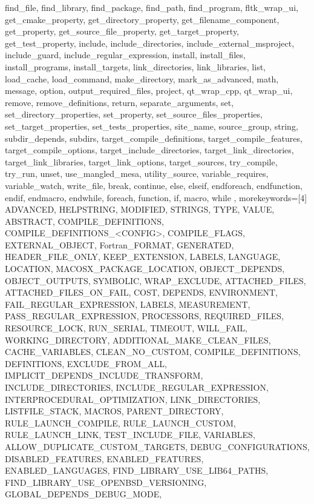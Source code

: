 {{      find_file, find_library, find_package, find_path, find_program,
      fltk_wrap_ui, get_cmake_property, get_directory_property,
      get_filename_component, get_property, get_source_file_property,
      get_target_property, get_test_property, include, include_directories,
      include_external_msproject, include_guard,
      include_regular_expression, install, install_files, install_programs,
      install_targets, link_directories, link_libraries, list, load_cache,
      load_command, make_directory, mark_as_advanced, math, message,
      option, output_required_files, project, qt_wrap_cpp, qt_wrap_ui,
      remove, remove_definitions, return, separate_arguments, set,
      set_directory_properties, set_property, set_source_files_properties,
      set_target_properties, set_tests_properties, site_name, source_group,
      string, subdir_depends, subdirs, target_compile_definitions,
      target_compile_features, target_compile_options,
      target_include_directories, target_link_directories,
      target_link_libraries, target_link_options, target_sources,
      try_compile, try_run, unset, use_mangled_mesa, utility_source,
      variable_requires, variable_watch, write_file, break, continue, else,
      elseif, endforeach, endfunction, endif, endmacro, endwhile, foreach,
      function, if, macro, while },
    morekeywords=[4]{ ADVANCED, HELPSTRING, MODIFIED, STRINGS, TYPE, VALUE,
      ABSTRACT, COMPILE_DEFINITIONS, COMPILE_DEFINITIONS_<CONFIG>,
      COMPILE_FLAGS, EXTERNAL_OBJECT, Fortran_FORMAT, GENERATED,
      HEADER_FILE_ONLY, KEEP_EXTENSION, LABELS, LANGUAGE, LOCATION,
      MACOSX_PACKAGE_LOCATION, OBJECT_DEPENDS, OBJECT_OUTPUTS, SYMBOLIC,
      WRAP_EXCLUDE, ATTACHED_FILES, ATTACHED_FILES_ON_FAIL, COST, DEPENDS,
      ENVIRONMENT, FAIL_REGULAR_EXPRESSION, LABELS, MEASUREMENT,
      PASS_REGULAR_EXPRESSION, PROCESSORS, REQUIRED_FILES, RESOURCE_LOCK,
      RUN_SERIAL, TIMEOUT, WILL_FAIL, WORKING_DIRECTORY,
      ADDITIONAL_MAKE_CLEAN_FILES, CACHE_VARIABLES, CLEAN_NO_CUSTOM,
      COMPILE_DEFINITIONS, DEFINITIONS, EXCLUDE_FROM_ALL,
      IMPLICIT_DEPENDS_INCLUDE_TRANSFORM, INCLUDE_DIRECTORIES,
      INCLUDE_REGULAR_EXPRESSION, INTERPROCEDURAL_OPTIMIZATION,
      LINK_DIRECTORIES, LISTFILE_STACK, MACROS, PARENT_DIRECTORY,
      RULE_LAUNCH_COMPILE, RULE_LAUNCH_CUSTOM, RULE_LAUNCH_LINK,
      TEST_INCLUDE_FILE, VARIABLES, ALLOW_DUPLICATE_CUSTOM_TARGETS,
      DEBUG_CONFIGURATIONS, DISABLED_FEATURES, ENABLED_FEATURES,
      ENABLED_LANGUAGES, FIND_LIBRARY_USE_LIB64_PATHS,
      FIND_LIBRARY_USE_OPENBSD_VERSIONING, GLOBAL_DEPENDS_DEBUG_MODE,
}}

